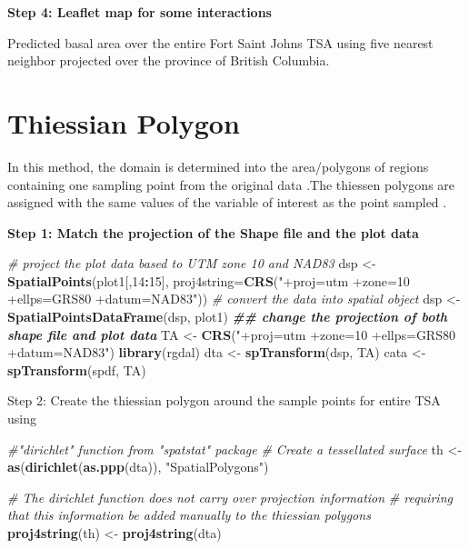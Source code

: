 \documentclass[
]{book}
\newenvironment{Shaded}{\begin{snugshade}}{\end{snugshade}}
\newcommand{\AttributeTok}[1]{\textcolor[rgb]{0.13,0.29,0.53}{#1}}
\newcommand{\CommentTok}[1]{\textcolor[rgb]{0.56,0.35,0.01}{\textit{#1}}}
\newcommand{\DecValTok}[1]{\textcolor[rgb]{0.00,0.00,0.81}{#1}}
\newcommand{\DocumentationTok}[1]{\textcolor[rgb]{0.56,0.35,0.01}{\textbf{\textit{#1}}}}
\newcommand{\FunctionTok}[1]{\textcolor[rgb]{0.13,0.29,0.53}{\textbf{#1}}}
\newcommand{\NormalTok}[1]{#1}
\newcommand{\OtherTok}[1]{\textcolor[rgb]{0.56,0.35,0.01}{#1}}
\newcommand{\SpecialCharTok}[1]{\textcolor[rgb]{0.81,0.36,0.00}{\textbf{#1}}}
\newcommand{\StringTok}[1]{\textcolor[rgb]{0.31,0.60,0.02}{#1}}
\begin{document}
\textbf{Step 4: Leaflet map for some interactions}

Predicted basal area over the entire Fort Saint Johns TSA using five nearest neighbor projected over the province of British Columbia.

\hypertarget{thiessian-polygon}{%
\section{Thiessian Polygon}\label{thiessian-polygon}}

In this method, the domain is determined into the area/polygons of regions containing one sampling point from the original data \citep{coulston_effect_nodate}.The thiessen polygons are assigned with the same values of the variable of interest as the point sampled \citep{yamada_thiessen_2016}.

\textbf{Step 1: Match the projection of the Shape file and the plot data}

\begin{Shaded}
\begin{Highlighting}[]
\CommentTok{\# project the plot data based to UTM zone 10 and NAD83}
\NormalTok{dsp }\OtherTok{\textless{}{-}} \FunctionTok{SpatialPoints}\NormalTok{(plot1[,}\DecValTok{14}\SpecialCharTok{:}\DecValTok{15}\NormalTok{], }\AttributeTok{proj4string=}\FunctionTok{CRS}\NormalTok{(}\StringTok{"+proj=utm +zone=10 +ellps=GRS80 +datum=NAD83"}\NormalTok{))}
\CommentTok{\# convert the data into spatial object}
\NormalTok{dsp }\OtherTok{\textless{}{-}} \FunctionTok{SpatialPointsDataFrame}\NormalTok{(dsp, plot1)}
\DocumentationTok{\#\# change the projection of both shape file and plot data}
\NormalTok{TA }\OtherTok{\textless{}{-}} \FunctionTok{CRS}\NormalTok{(}\StringTok{"+proj=utm +zone=10 +ellps=GRS80 +datum=NAD83"}\NormalTok{)}
\FunctionTok{library}\NormalTok{(rgdal)}
\NormalTok{dta }\OtherTok{\textless{}{-}} \FunctionTok{spTransform}\NormalTok{(dsp, TA)}
\NormalTok{cata }\OtherTok{\textless{}{-}} \FunctionTok{spTransform}\NormalTok{(spdf, TA)}
\end{Highlighting}
\end{Shaded}

Step 2: Create the thiessian polygon around the sample points for entire TSA using

\begin{Shaded}
\begin{Highlighting}[]
\CommentTok{\#"dirichlet" function from "spatstat" package}
\CommentTok{\# Create a tessellated surface}
\NormalTok{th  }\OtherTok{\textless{}{-}}  \FunctionTok{as}\NormalTok{(}\FunctionTok{dirichlet}\NormalTok{(}\FunctionTok{as.ppp}\NormalTok{(dta)), }\StringTok{"SpatialPolygons"}\NormalTok{)}

\CommentTok{\# The dirichlet function does not carry over projection information}
\CommentTok{\# requiring that this information be added manually to the thiessian polygons}
\FunctionTok{proj4string}\NormalTok{(th) }\OtherTok{\textless{}{-}} \FunctionTok{proj4string}\NormalTok{(dta)}
\end{Highlighting}
\end{Shaded}
\end{document}
